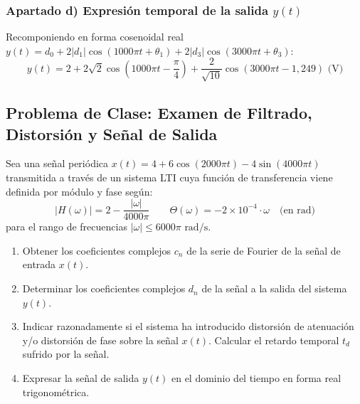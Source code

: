 \begin{resolucion}
\subsubsection*{Apartado d) Expresión temporal de la salida $y(t)$}

Recomponiendo en forma cosenoidal real $y(t) = d_0 + 2 |d_1| \cos(1000\pi t + \theta_1) + 2 |d_3| \cos(3000\pi t + \theta_3)$:
\[
y(t) = 2 + 2\sqrt{2} \cos\left(1000\pi t - \frac{\pi}{4}\right) + \frac{2}{\sqrt{10}} \cos\left(3000\pi t - 1{,}249\right)\text{ (V)}
\]
\end{resolucion}

\newpage

\subsection{Problema de Clase: Examen de Filtrado, Distorsión y Señal de Salida}

\begin{problema}
Sea una señal periódica $x(t) = 4 + 6\cos(2000\pi t) - 4\sin(4000\pi t)$ transmitida a través de un sistema LTI cuya función de transferencia viene definida por módulo y fase según:
\[
|H(\omega)| = 2 - \frac{|\omega|}{4000\pi} \qquad \Theta(\omega) = -2\times 10^{-4} \cdot \omega \quad \text{(en rad)}
\]
para el rango de frecuencias $|\omega| \le 6000\pi\text{ rad/s}$.

\begin{enumerate}[label=\alph*)]
    \item Obtener los coeficientes complejos $c_n$ de la serie de Fourier de la señal de entrada $x(t)$.
    \item Determinar los coeficientes complejos $d_n$ de la señal a la salida del sistema $y(t)$.
    \item Indicar razonadamente si el sistema ha introducido distorsión de atenuación y/o distorsión de fase sobre la señal $x(t)$. Calcular el retardo temporal $t_d$ sufrido por la señal.
    \item Expresar la señal de salida $y(t)$ en el dominio del tiempo en forma real trigonométrica.
\end{enumerate}
\end{problema}

